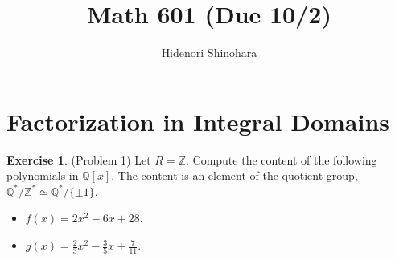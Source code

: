 \documentclass[12pt, psamsfonts]{amsart}
\theoremstyle{definition}
\newtheorem*{exer}{Exercise}
\theoremstyle{remark}
\numberwithin{equation}{section}
\begin{document}
\title{Math 601 (Due 10/2)}
\author{Hidenori Shinohara}
\maketitle

\tableofcontents

\section{Factorization in Integral Domains}

\begin{exer}{(Problem 1)}
  Let $R = \mathbb{Z}$.
  Compute the content of the following polynomials in $\mathbb{Q}[x]$.
  The content is an element of the quotient group, $\mathbb{Q}^* / \mathbb{Z}^* \simeq \mathbb{Q}^* / \{ \pm 1 \}$.
  \begin{itemize}
    \item
      $f(x) = 2x^2 - 6x + 28$.
    \item
      $g(x) = \frac{2}{3}x^2 - \frac{3}{5}x + \frac{7}{11}$.
  \end{itemize}
\end{exer}
\end{document}
